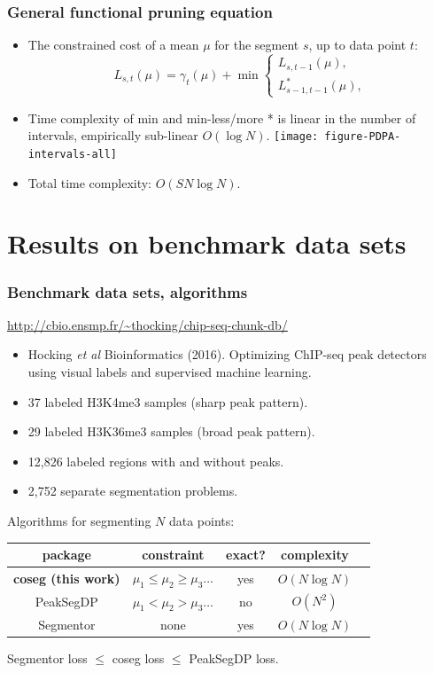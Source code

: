 \documentclass{beamer}
\begin{document}
\begin{frame}
  \frametitle{General functional pruning equation}
  \begin{itemize}
  \item The constrained cost of a mean $\mu$ for the segment $s$,
    up to data point $t$:
    \begin{equation*}
      L_{s,t}(\mu) = \gamma_t(\mu) + \min
      \begin{cases}
        L_{s,t-1}(\mu),\\
        L_{s-1,t-1}^{*}(\mu),
      \end{cases}
    \end{equation*}
  \item Time complexity of min and min-less/more * is linear in the
    number of intervals, empirically sub-linear $O(\log N)$.
    \texttt{[image: figure-PDPA-intervals-all]}
  \item Total time complexity: $O(S N\log N)$.
  \end{itemize}
\end{frame}

\section{Results on benchmark data sets}

\begin{frame}
  \frametitle{Benchmark data sets, algorithms}

 \url{http://cbio.ensmp.fr/~thocking/chip-seq-chunk-db/}
  \begin{itemize}
  \item Hocking \emph{et al} Bioinformatics (2016). Optimizing
    ChIP-seq peak detectors using visual labels and supervised machine
    learning.
  \item 37 labeled H3K4me3 samples (sharp peak pattern).
  \item 29 labeled H3K36me3 samples (broad peak pattern).
  \item 12,826 labeled regions with and without peaks.
  \item 2,752 separate segmentation problems.
  \end{itemize}

  Algorithms for segmenting $N$ data points:
  \begin{center}
  \begin{tabular}{ccccc}
    package & constraint & exact? & complexity \\
    \hline
    \textbf{coseg (this work)} & $\mu_1 \leq \mu_2 \geq \mu_3 \dots$ & yes & $O(N\log N)$ \\
    PeakSegDP & $\mu_1 < \mu_2 > \mu_3 \dots$ & no & $O(N^2)$\\
    Segmentor & none & yes & $O(N\log N)$
  \end{tabular}

  \vskip 0.5cm

  Segmentor loss $\leq$ coseg loss $\leq$ PeakSegDP loss.
  \end{center}
\end{frame}
\end{document}
